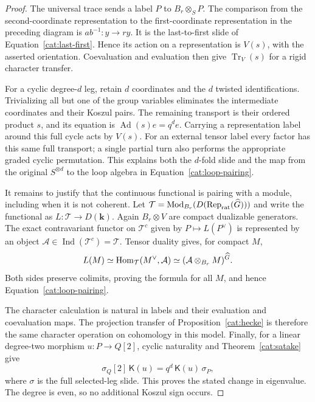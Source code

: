 \begin{proof}
The universal trace sends a label $P$ to $B_r\otimes_S P$.
The comparison from the second-coordinate representation
to the first-coordinate representation in the preceding
diagram is $a b^{-1}:y\to r y$. It is the last-to-first
slide of Equation~\eqref{cat:last-first}. Hence its action
on a representation is $V(s)$, with the asserted
orientation. Coevaluation and evaluation then give
$\operatorname{Tr}_V(s)$ for a rigid character transfer.

For a cyclic degree-$d$ leg, retain $d$ coordinates and
the $d$ twisted identifications. Trivializing all but one
of the group variables eliminates the intermediate
coordinates and their Koszul pairs. The remaining
transport is their ordered product $s$, and its equation
is $\operatorname{Ad}(s)e=q^d e$. Carrying a representation
label around this full cycle acts by $V(s)$. For an
external tensor label every factor has this same full
transport; a single partial turn also performs the
appropriate graded cyclic permutation. This explains
both the $d$-fold slide and the map from the original
$S^{\otimes d}$ to the loop algebra in
Equation~\eqref{cat:loop-pairing}.

It remains to justify that the continuous functional is
pairing with a module, including when it is not coherent.
Let $\mathcal T=\operatorname{Mod}_{B_r}
(D(\operatorname{Rep}_{\rm rat}(\widehat G)))$ and write the
functional as $L:\mathcal T\to D(\mathbf k)$.
Again $B_r\otimes V$ are compact dualizable generators.
The exact contravariant functor on $\mathcal T^c$
given by $P\mapsto L(P^\vee)$ is represented by an
object $\mathcal A\in\operatorname{Ind}(\mathcal T^c)
=\mathcal T$. Tensor duality gives, for compact $M$,
\[
 L(M)\simeq
 \operatorname{Hom}_{\mathcal T}(M^\vee,\mathcal A)
 \simeq(\mathcal A\otimes_{B_r}M)^{\widehat G}.
\]
Both sides preserve colimits, proving the formula for
all $M$, and hence Equation~\eqref{cat:loop-pairing}.

The character calculation is natural in labels and
their evaluation and coevaluation maps. The projection
transfer of Proposition~\ref{cat:hecke} is therefore the
same character operation on cohomology in this model. Finally, for a
linear degree-two morphism $u:P\to Q[2]$, cyclic
naturality and Theorem~\ref{cat:satake} give
\[
 \sigma_Q[2]\,\mathsf K(u)
       =q^d\,\mathsf K(u)\,\sigma_P,
\]
where $\sigma$ is the full selected-leg slide. This
proves the stated change in eigenvalue. The degree is
even, so no additional Koszul sign occurs.
\end{proof}

